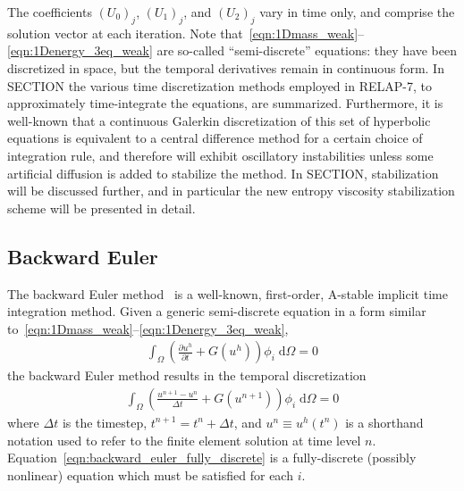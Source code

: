The coefficients $(U_0)_j$, $(U_1)_j$, and $(U_2)_j$ vary in time only, and comprise the
solution vector at each iteration.  Note
that~\eqref{eqn:1Dmass_weak}--\eqref{eqn:1Denergy_3eq_weak} are
so-called ``semi-discrete'' equations: they have been discretized in
space, but the temporal derivatives remain in continuous form.  In
SECTION the various time discretization methods
employed in RELAP-7, to approximately time-integrate the equations,
are summarized.  Furthermore, it is well-known
that a continuous Galerkin discretization of this set of hyperbolic
equations is equivalent to a central difference method for a certain
choice of integration rule, and therefore will exhibit oscillatory
instabilities unless some artificial diffusion is added to stabilize
the method.  In SECTION, stabilization will be
discussed further, and in particular the new entropy viscosity 
stabilization scheme will be presented in detail.
%
\subsection{Backward Euler\label{sec:backward_euler}}
%
The backward Euler method~\cite{Butcher_2003} is a well-known, first-order, A-stable
implicit time integration method.  Given a generic
semi-discrete equation in a form similar to~\eqref{eqn:1Dmass_weak}--\eqref{eqn:1Denergy_3eq_weak},
\begin{align}
  \int_{\Omega} \left(\frac{\partial u^h}{\partial t} + G(u^h) \right) \phi_i \; \text{d}{\Omega} = 0
\end{align}
the backward Euler method results in the temporal discretization
\begin{align}
  \label{eqn:backward_euler_fully_discrete}
  \int_{\Omega} \left( \frac{u^{n+1} - u^n}{\Delta t} + G(u^{n+1}) \right) \phi_i \; \text{d}{\Omega} = 0
\end{align}
where $\Delta t$ is the timestep, $t^{n+1} = t^n + \Delta t$, and $u^n
\equiv u^h(t^n)$ is a shorthand notation used to refer to the finite
element solution at time level
$n$. Equation~\eqref{eqn:backward_euler_fully_discrete} is a
fully-discrete (possibly nonlinear) equation which must be satisfied
for each $i$.


